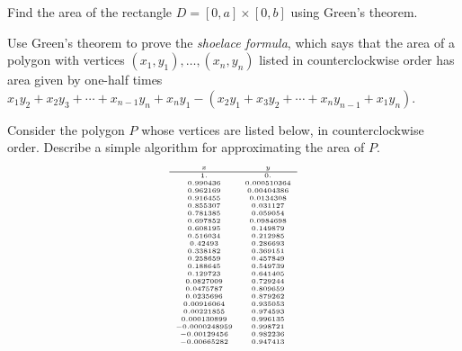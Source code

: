 \documentclass[svgnames]{watsonbook}
\begin{document}

\begin{aexercise}
  Find the area of the rectangle $D=[0,a]\times[0,b]$ using Green's
  theorem.
\end{aexercise}

\begin{aexercise}
Use Green's theorem to prove the \textit{shoelace
  formula}, which says that the area of a polygon with vertices
$(x_1,y_1),\ldots,(x_n,y_n)$ listed in counterclockwise order has area
given by one-half times
$x_1y_2 + x_2 y_3 + \cdots + x_{n-1}y_n + x_n y_1 - (x_2 y_1 + x_3 y_2
+ \cdots + x_{n}y_{n-1}+ x_1 y_n)$.
\end{aexercise}

\begin{aexercise}
Consider the polygon $P$ whose vertices are listed below, in counterclockwise order. Describe a simple algorithm for approximating the area of $P$. 
$$ \tiny
\begin{array}{cc}
  x & y \\ \hline 
 1. & 0. \\
 0.990436 & 0.000510364 \\
 0.962169 & 0.00404386 \\
 0.916455 & 0.0134308 \\
 0.855307 & 0.031127 \\
 0.781385 & 0.059054 \\
 0.697852 & 0.0984698 \\
 0.608195 & 0.149879 \\
 0.516034 & 0.212985 \\
 0.42493 & 0.286693 \\
 0.338182 & 0.369151 \\
 0.258659 & 0.457849 \\
 0.188645 & 0.549739 \\
 0.129723 & 0.641405 \\
 0.0827009 & 0.729244 \\
 0.0475787 & 0.809659 \\
 0.0235696 & 0.879262 \\
 0.00916064 & 0.935053 \\
 0.00221855 & 0.974593 \\
 0.000130899 & 0.996135 \\
 -0.0000248959 & 0.998721 \\
 -0.00129456 & 0.982236 \\
 -0.00665282 & 0.947413 \\

\end{array}$$
\end{aexercise}
\end{document}
